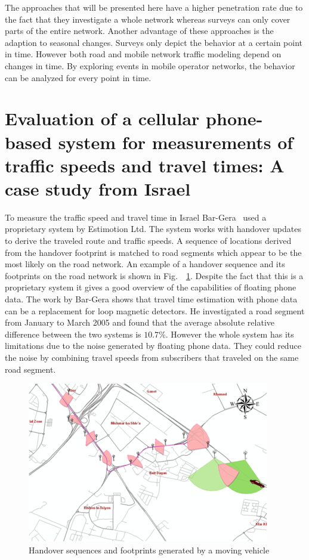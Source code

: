\documentclass[master,english]{hgbthesis}
\begin{document}
The approaches that will be presented here have a higher penetration rate due to the fact that they investigate a whole network whereas surveys can only cover parts of the entire network. Another advantage of these approaches is the adaption to seasonal changes. Surveys only depict the behavior at a certain point in time. However both road and mobile network traffic modeling depend on changes in time. By exploring events in mobile operator networks, the behavior can be analyzed for every point in time.

\section{Evaluation of a cellular phone-based system for measurements of traffic speeds and travel times: A case study from Israel}

To measure the traffic speed and travel time in Israel Bar-Gera~\cite{Bar2007} used a proprietary system by Estimotion Ltd. The system works with handover updates to derive the traveled route and traffic speeds. A sequence of locations derived from the handover footprint is matched to road segments which appear to be the most likely on the road network. An example of a handover sequence and its footprints on the road network is shown in Fig.\ ~\ref{fig:bar}. Despite the fact that this is a proprietary system it gives a good overview of the capabilities of floating phone data. The work by Bar-Gera shows that travel time estimation with phone data can be a replacement for loop magnetic detectors. He investigated a road segment from January to March 2005 and found that the average absolute relative difference between the two systems is $10.7\%$. However the whole system has its limitations due to the noise generated by floating phone data. They could reduce the noise by combining travel speeds from subscribers that traveled on the same road segment.

\begin{figure}

\centering

\includegraphics[width=\linewidth]{images/bar.png}

\caption{Handover sequences and footprints generated by a moving vehicle~\cite{Bar2007}}

\label{fig:bar}

\end{figure}
\end{document}
